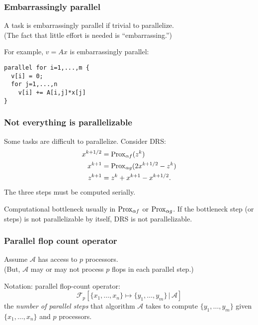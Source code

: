 \documentclass[10pt,mathserif]{beamer}
\begin{document}
\begin{frame}[fragile]
\frametitle{Embarrassingly parallel}
A task is embarrassingly parallel if trivial to parallelize.\\
(The fact that little effort is needed is ``embarrassing.'')
\vspace{0.2in}\pause

For example, $v=Ax$ is embarrassingly parallel:
\begin{lstlisting}
parallel for i=1,...,m {
  v[i] = 0;
  for j=1,...,n 
    v[i] += A[i,j]*x[j]
}
\end{lstlisting}
\end{frame}

\begin{frame}
\frametitle{Not everything is parallelizable}
Some tasks are difficult to parallelize.
Consider DRS:
\begin{align*}
x^{k+1/2}&=\mathrm{Prox}_{\alpha f}(z^k)\\
x^{k+1}&=\mathrm{Prox}_{\alpha g}(2x^{k+1/2}-z^k)\\
z^{k+1}&=z^k+x^{k+1}-x^{k+1/2}.
\end{align*}
The three steps must be computed serially.
 


\vspace{0.2in}
Computational bottleneck usually in $\mathrm{Prox}_{\alpha f}$ or $\mathrm{Prox}_{\alpha g}$.
If the bottleneck step (or steps) is not parallelizable by itself, DRS is not parallelizable.
\end{frame}





\begin{frame}
\frametitle{Parallel flop count operator}
Assume $\mathcal{A}$ has access to $p$ processors.\\
(But, $\mathcal{A}$ may or may not process $p$ flops in each parallel step.)
\vspace{0.2in}


Notation: parallel flop-count operator:
\[
\mathcal{F}_p\left[\{x_1,\dots,x_n\}\mapsto\{y_1,\dots,y_m\}\,|\,\mathcal{A}\right]
\]
the \emph{number of parallel steps} that algorithm $\mathcal{A}$ takes to compute $\{y_1,\dots,y_m\}$ given $\{x_1,\dots,x_n\}$ and $p$ processors.
\end{frame}
\end{document}
